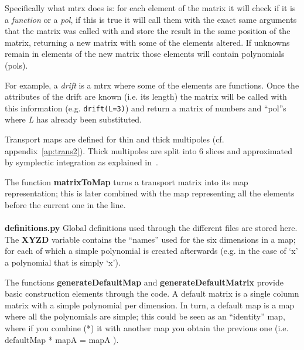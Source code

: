 \documentclass[a4paper]{cernatsnote}
\begin{document}
Specifically what mtrx does is: for each element of the matrix it will
check if it is a \textit{function} or a \textit{pol}, if this is true
it will call them with the exact same arguments that the matrix was
called with and store the result in the same position of the matrix,
returning a new matrix with some of the elements altered. If unknowns
remain in elements of the new matrix those elements will contain
polynomials (pols).

For example, a \textit{drift} is a mtrx where some of the elements
are functions. Once the attributes of the drift are known (i.e. its
length) the matrix will be called with this information
(e.g. \texttt{drift(L=3)}) and return a matrix of numbers and
``pol''s where \textit{L} has already been substituted.

Transport maps are defined for thin and thick multipoles (cf.
appendix~\ref{ap:trans2}). Thick multipoles are split into 6 slices
and approximated by symplectic integration as explained in~\cite{geo}.

The function \textbf{matrixToMap} turns a transport matrix into its
map representation; this is later combined with the map representing
all the elements before the current one in the line.
\\\\
\textbf{definitions.py}
Global definitions used through the different files are stored here.
The \textbf{XYZD} variable contains the ``names'' used for the six
dimensions in a map; for each of which a simple polynomial is created
afterwards (e.g. in the case of `x' a polynomial that is simply `x').

The functions \textbf{generateDefaultMap} and
\textbf{generateDefaultMatrix} provide basic construction elements
through the code. A default matrix is a single column matrix with a
simple polynomial per dimension. In turn, a default map is a map where
all the polynomials are simple; this could be seen as an ``identity''
map, where if you combine (*) it with another map you obtain the previous
one (i.e. defaultMap * mapA = mapA ).
\end{document}
